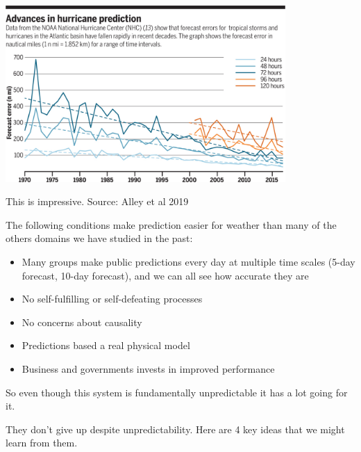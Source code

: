 \documentclass[aspectratio=169]{beamer}
\begin{document}
\begin{frame}

\begin{center}
\includegraphics[width = 0.8\textwidth]{figures/alley_advances_2019_fig2}
\end{center}

\vfill
This is impressive. Source: Alley et al 2019

\end{frame}
\begin{frame}

The following conditions make prediction easier for weather than many of the others domains we have studied in the past:
\begin{itemize}
\item Many groups make public predictions every day at multiple time scales (5-day forecast, 10-day forecast), and we can all see how accurate they are
\pause
\item No self-fulfilling or self-defeating processes 
\pause
\item No concerns about causality
\pause
\item Predictions based a real physical model
\pause
\item Business and governments invests in improved performance
\end{itemize}

So even though this system is fundamentally unpredictable it has a lot going for it.
\end{frame}
\begin{frame}

They don't give up despite unpredictability.  Here are 4 key ideas that we might learn from them.

\end{frame}
\end{document}
